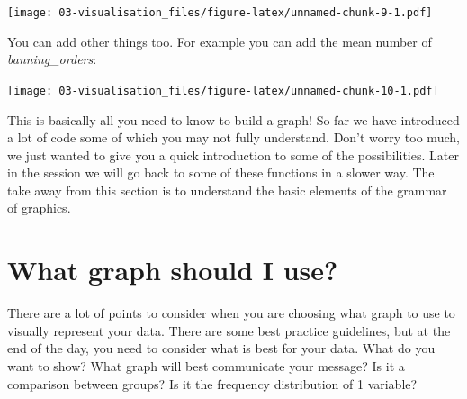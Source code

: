 \documentclass[
]{book}
\newenvironment{Shaded}{\begin{snugshade}}{\end{snugshade}}
\newcommand{\AttributeTok}[1]{\textcolor[rgb]{0.77,0.63,0.00}{#1}}
\newcommand{\CommentTok}[1]{\textcolor[rgb]{0.56,0.35,0.01}{\textit{#1}}}
\newcommand{\DecValTok}[1]{\textcolor[rgb]{0.00,0.00,0.81}{#1}}
\newcommand{\FunctionTok}[1]{\textcolor[rgb]{0.00,0.00,0.00}{#1}}
\newcommand{\NormalTok}[1]{#1}
\newcommand{\SpecialCharTok}[1]{\textcolor[rgb]{0.00,0.00,0.00}{#1}}
\newcommand{\StringTok}[1]{\textcolor[rgb]{0.31,0.60,0.02}{#1}}
\begin{document}
\texttt{[image: 03-visualisation\_files/figure-latex/unnamed-chunk-9-1.pdf]}

You can add other things too. For example you can add the mean number of \emph{banning\_orders}:

\begin{Shaded}
\end{Shaded}

\texttt{[image: 03-visualisation\_files/figure-latex/unnamed-chunk-10-1.pdf]}

This is basically all you need to know to build a graph! So far we have introduced a lot of code some of which you may not fully understand. Don't worry too much, we just wanted to give you a quick introduction to some of the possibilities. Later in the session we will go back to some of these functions in a slower way. The take away from this section is to understand the basic elements of the grammar of graphics.

\hypertarget{what-graph-should-i-use}{%
\section{What graph should I use?}\label{what-graph-should-i-use}}

There are a lot of points to consider when you are choosing what graph to use to visually represent your data. There are some best practice guidelines, but at the end of the day, you need to consider what is best for your data. What do you want to show? What graph will best communicate your message? Is it a comparison between groups? Is it the frequency distribution of 1 variable?
\end{document}
